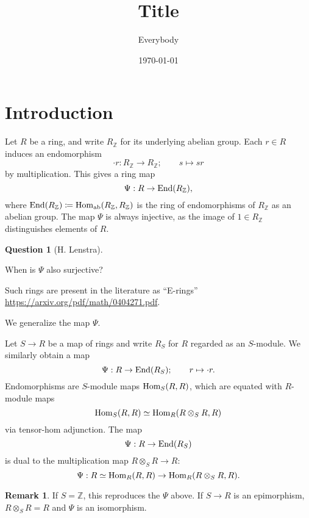 \documentclass[11pt,reqno]{amsart}
\title{Title}
\author{Everybody}
\date{\today}
\theoremstyle{definition}
\newtheorem{remark}[theorem]{Remark}
\newtheorem{question}[theorem]{Question}
\newcommand{\ZZ}{\mathbb{Z}}
\newcommand{\Hom}{{\rm Hom}}
\newcommand{\End}{{\rm End}}
\begin{document}
\maketitle

\section{Introduction}


Let $R$ be a ring, and write $R_{\ZZ}$ for its underlying abelian group. Each $r \in R$ induces an endomorphism
\[\cdot r : R_\ZZ \to R_\ZZ; \qquad s \mapsto sr\]
by multiplication. This gives a ring map
\begin{equation}\label{eqn:psiringabelianZ}
	\Psi : R \to \End(R_\ZZ),
\end{equation}
where $\End(R_\ZZ) \coloneqq \Hom_{\rm ab}(R_\ZZ, R_\ZZ)$ is the ring of endomorphisms of $R_\ZZ$ as an abelian group. The map $\Psi$ is always injective, as the image of $1 \in R_\ZZ$ distinguishes elements of $R$. 


\begin{question}[H. Lenstra]\label{q:lenstra}

When is $\Psi$ also surjective?

\end{question}


Such rings are present in the literature as ``E-rings'' \url{https://arxiv.org/pdf/math/0404271.pdf}. 

We generalize the map $\Psi$.

Let $S \to R$ be a map of rings and write $R_S$ for $R$ regarded as an $S$-module. We similarly obtain a map
\begin{equation}\label{eqn:ringabelian}
\Psi : R \to \End(R_S); \qquad r \mapsto \cdot r.
\end{equation}
Endomorphisms are $S$-module maps $\Hom_S(R, R)$, which are equated with $R$-module maps
\[\Hom_S(R, R) \simeq \Hom_R(R \otimes_S R, R)\]
via tensor-hom adjunction. The map
\[\Psi : R \to \End(R_S)\]
is dual to the multiplication map $R \otimes_S R \to R$:
\[\Psi : R \simeq \Hom_R(R, R) \to \Hom_R(R \otimes_S R, R).\]

\begin{remark}

If $S = \ZZ$, this reproduces the $\Psi$ above. If $S \to R$ is an epimorphism, $R \otimes_S R = R$ and $\Psi$ is an isomorphism. 


\end{remark}
\end{document}
